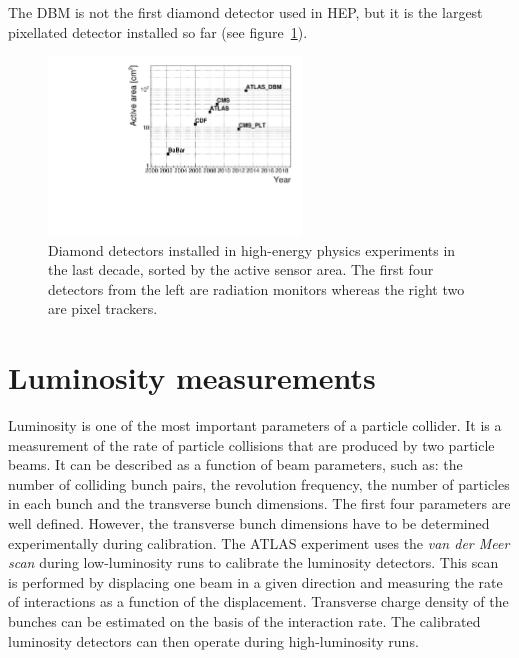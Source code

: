 \documentclass[12pt]{packages/mytustyle}  %
\begin{document}
The DBM is not the first diamond detector used in HEP, but it is the largest pixellated detector installed so far (see figure~\ref{fig:areavsyear}).
\begin{figure}[!t]
\centering
\includegraphics[width=0.6\textwidth]{../../scripts/04_charge_monitoring/plots/detArea}
\caption{Diamond detectors installed in high-energy physics experiments in the last decade, sorted by the active sensor area. The first four detectors from the left are radiation monitors whereas the right two are pixel trackers.}
\label{fig:areavsyear}
\end{figure}

\section{Luminosity measurements}
\label{sec:lummeas}
 \label{sec:lumi}
Luminosity is one of the most important parameters of a particle collider. It is a measurement of the rate of particle collisions that are produced by two particle beams. It can be described as a function of beam parameters, such as: the number of colliding bunch pairs, the revolution frequency, the number of particles in each bunch and the transverse bunch dimensions. The first four parameters are well defined. However, the transverse bunch dimensions have to be determined experimentally during calibration. The ATLAS experiment uses the \emph{van der Meer scan} \cite{} during low-luminosity runs to calibrate the luminosity detectors. This scan is performed by displacing one beam in a given direction and measuring the rate of interactions as a function of the displacement. Transverse charge density of the bunches can be estimated on the basis of the interaction rate. The calibrated luminosity detectors can then operate during high-luminosity runs.
\end{document}
